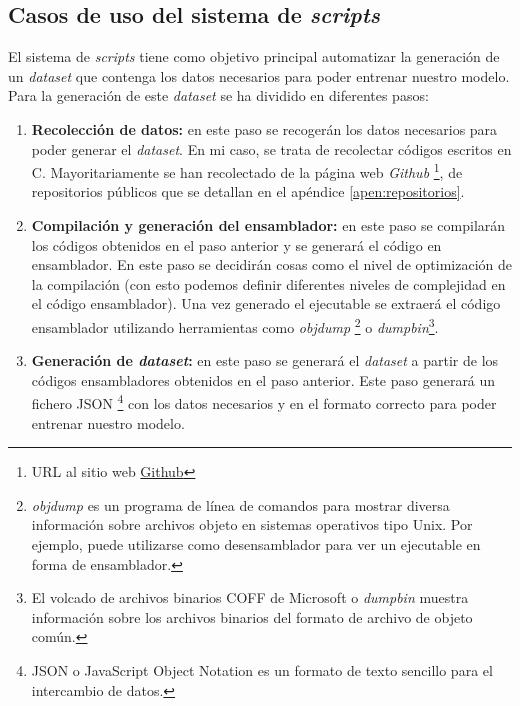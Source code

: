 \subsection{Casos de uso del sistema de \textit{scripts}}
\label{subsec:casos_uso_sistema_scripts}


El sistema de \textit{scripts} tiene como objetivo principal automatizar la generación de un \textit{dataset}
que contenga los datos necesarios para poder entrenar nuestro modelo. Para la generación
de este \textit{dataset} se ha dividido en diferentes pasos:

\begin{enumerate}
    \item \textbf{Recolección de datos:} en este paso se recogerán los datos necesarios
        para poder generar el \textit{dataset}. En mi caso, se trata de recolectar códigos escritos
        en C. Mayoritariamente se han recolectado de la página web \textit{Github}
        \footnote{URL al sitio web \href{https://github.com/}{Github}}, de repositorios 
        públicos que se detallan en el apéndice \ref{apen:repositorios}.
    \item \textbf{Compilación y generación del ensamblador:} en este paso se compilarán los
        códigos obtenidos en el paso anterior y se generará el código en ensamblador. En este
        paso se decidirán cosas como el nivel de optimización de la compilación (con esto podemos
        definir diferentes niveles de complejidad en el código ensamblador). Una vez generado el
        ejecutable se extraerá el código ensamblador utilizando herramientas como \textit{objdump}
        \footnote{\textit{objdump} es un programa de línea de comandos para mostrar 
        diversa información sobre archivos objeto en sistemas operativos tipo Unix. Por ejemplo, 
        puede utilizarse como desensamblador para ver un ejecutable en forma de ensamblador.} o 
        \textit{dumpbin}\footnote{El volcado de archivos binarios COFF de Microsoft o \textit{dumpbin}
        muestra información sobre los archivos binarios del formato de archivo de objeto común.}.
    \item \textbf{Generación de \textit{dataset}:} en este paso se generará el \textit{dataset} a partir de los
        códigos ensambladores obtenidos en el paso anterior. Este paso generará un fichero JSON
        \footnote{JSON o JavaScript Object Notation es un formato de texto sencillo para el 
        intercambio de datos.} con los datos necesarios y en el formato correcto para poder 
        entrenar nuestro modelo.
\end{enumerate}

